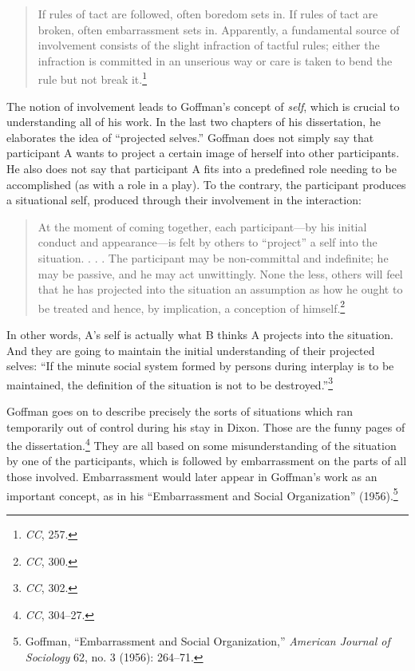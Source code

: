 \documentclass[openany,nobib]{tufte-book}
\begin{document}
\begin{quote}
If rules of tact are followed, often boredom sets in. If rules of tact
are broken, often embarrassment sets in. Apparently, a fundamental
source of involvement consists of the slight infraction of tactful
rules; either the infraction is committed in an unserious way or care is
taken to bend the rule but not break it.\footnote{\emph{CC}, 257.}
\end{quote}

\noindent The notion of involvement leads to Goffman's concept of \emph{self},
which is crucial to understanding all of his work. In the last two
chapters of his dissertation, he elaborates the idea of ``projected
selves.'' Goffman does not simply say that participant A wants to
project a certain image of herself into other participants. He also does
not say that participant A fits into a predefined role needing to be
accomplished (as with a role in a play). To the contrary, the
participant produces a situational self, produced through their
involvement in the interaction:

\begin{quote}
At the moment of coming together, each participant---by his initial
conduct and appearance---is felt by others to ``project'' a self into
the situation. . . . The participant may be non-committal and
indefinite; he may be passive, and he may act unwittingly. None the
less, others will feel that he has projected into the situation an
assumption as how he ought to be treated and hence, by implication, a
conception of himself.\footnote{\emph{CC}, 300.}
\end{quote}

\noindent In other words, A's self is actually what B thinks A projects into the
situation. And they are going to maintain the initial understanding of
their projected selves: ``If the minute social system formed by persons
during interplay is to be maintained, the definition of the situation is
not to be destroyed.''\footnote{\emph{CC}, 302.}

Goffman goes on to describe precisely the sorts of situations which ran
temporarily out of control during his stay in Dixon. Those are the funny
pages of the dissertation.\footnote{\emph{CC}, 304--27.} They are all
based on some misunderstanding of the situation by one of the
participants, which is followed by embarrassment on the parts of all
those involved. Embarrassment would later appear in Goffman's work as an
important concept, as in his ``Embarrassment and Social Organization''
(1956).\footnote{Goffman, ``Embarrassment and Social Organization,''
  \emph{American Journal of Sociology} 62, no. 3 (1956): 264--71.}
\end{document}

